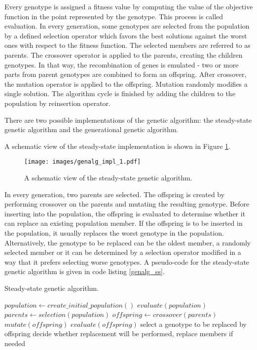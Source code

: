 Every genotype is assigned a fitness value by computing the value of the objective function in the point represented by the genotype.
This process is called evaluation.
In every generation, some genotypes are selected from the population by a defined selection operator which favors the best solutions against the worst ones with respect to the fitness function.
The selected members are referred to as parents.
The crossover operator is applied to the parents, creating the children genotypes.
In that way, the recombination of genes is emulated - two or more parts from parent genotypes are combined to form an offspring.
After crossover, the mutation operator is applied to the offspring.
Mutation randomly modifies a single solution.
The algorithm cycle is finished by adding the children to the population by reinsertion operator.

There are two possible implementations of the genetic algorithm: the steady-state genetic algorithm and the generational genetic algorithm.

A schematic view of the steady-state implementation is shown in Figure \ref{genalg:impl_1}.
\begin{figure}[ht]
    \centering
    \texttt{[image: images/genalg\_impl\_1.pdf]}
    \caption{A schematic view of the steady-state genetic algorithm.}
    \label{genalg:impl_1}
\end{figure}
In every generation, two parents are selected.
The offspring is created by performing crossover on the parents and mutating the resulting genotype.
Before inserting into the population, the offspring is evaluated to determine whether it can replace an existing population member.
If the offspring is to be inserted in the population, it usually replaces the worst genotype in the population.
Alternatively, the genotype to be replaced can be the oldest member, a randomly selected member or it can be determined by a selection operator modified in a way that it prefers selecting worse genotypes.
A pseudo-code for the steady-state genetic algorithm is given in code listing \ref{genalg_ss}.
\begin{algorithm}
\caption{Steady-state genetic algorithm.\label{genalg_ss}}
\begin{algorithmic}
\STATE $population \leftarrow create\_initial\_population()$
\STATE $evaluate(population)$
\STATE $parents \leftarrow selection(population)$
\STATE $offspring \leftarrow crossover(parents)$
\STATE $mutate(offspring)$
\STATE $evaluate(offspring)$
\STATE select a genotype to be replaced by offspring
\STATE decide whether replacement will be performed, replace members if needed
\ENDWHILE
\end{algorithmic}
\end{algorithm}


